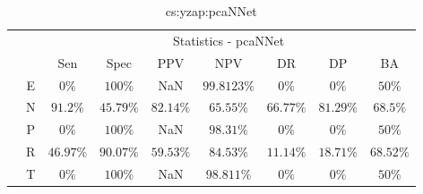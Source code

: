 \begin{table}[!ht]
	\centering
	\begin{tabular}{|c|c|c|c|c|c|c|c|c|}
		\cline{3-9}
		\multicolumn{2}{c|}{} & \multicolumn{7}{c|}{Statistics - pcaNNet} \\ \cline{3-9}
		\multicolumn{2}{c|}{} & Sen & Spec & PPV & NPV & DR & DP & BA \\ \hline
		\multirow{5}{*}{\rotatebox{90}{Class}} & E & $0\%$ & $100\%$ & NaN & $99.8123\%$ & $0\%$ & $0\%$ & $50\%$ \\ \cline{2-9}
		 & N & $91.2\%$ & $45.79\%$ & $82.14\%$ & $65.55\%$ & $66.77\%$ & $81.29\%$ & $68.5\%$ \\ \cline{2-9}
		 & P & $0\%$ & $100\%$ & NaN & $98.31\%$ & $0\%$ & $0\%$ & $50\%$ \\ \cline{2-9}
		 & R & $46.97\%$ & $90.07\%$ & $59.53\%$ & $84.53\%$ & $11.14\%$ & $18.71\%$ & $68.52\%$ \\ \cline{2-9}
		 & T & $0\%$ & $100\%$ & NaN & $98.811\%$ & $0\%$ & $0\%$ & $50\%$ \\ \hline
	\end{tabular}
	\caption{cs:yzap:pcaNNet}
	\label{tab:cs:yzap:pcaNNet}
\end{table}
